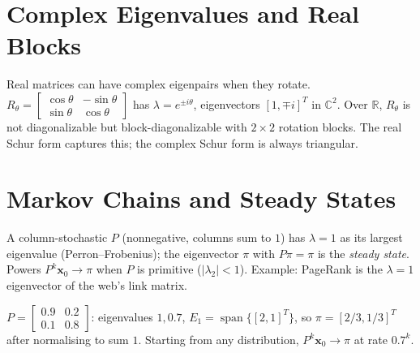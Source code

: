 \section{Complex Eigenvalues and Real Blocks}
\label{sec:complex-eigen}
Real matrices can have complex eigenpairs when they rotate. $R_\theta=\begin{bmatrix}\cos\theta&-\sin\theta\\\sin\theta&\cos\theta\end{bmatrix}$ has $\lambda=e^{\pm i\theta}$, eigenvectors $[1,\mp i]^T$ in $\mathbb{C}^2$. Over $\mathbb{R}$, $R_\theta$ is not diagonalizable but block-diagonalizable with $2\times2$ rotation blocks. The real Schur form captures this; the complex Schur form is always triangular.

\section{Markov Chains and Steady States}
\label{sec:markov}
A column-stochastic $P$ (nonnegative, columns sum to $1$) has $\lambda=1$ as its largest eigenvalue (Perron--Frobenius); the eigenvector $\pi$ with $P\pi=\pi$ is the \emph{steady state}. Powers $P^k\mathbf{x}_0\to\pi$ when $P$ is primitive ($|\lambda_2|<1$). Example: PageRank is the $\lambda=1$ eigenvector of the web's link matrix.

\begin{example}
$P=\begin{bmatrix}0.9&0.2\\0.1&0.8\end{bmatrix}$: eigenvalues $1,0.7$, $E_1=\operatorname{span}\{[2,1]^T\}$, so $\pi=[2/3,1/3]^T$ after normalising to sum $1$. Starting from any distribution, $P^k\mathbf{x}_0\to\pi$ at rate $0.7^k$.
\end{example}

